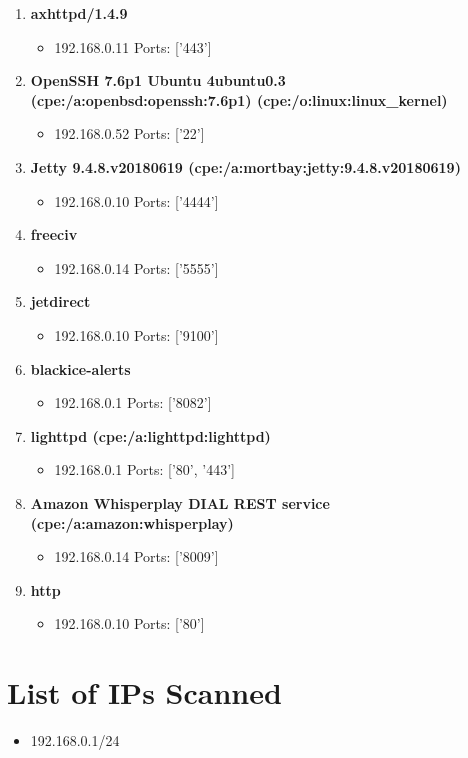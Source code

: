 \documentclass{article}
\begin{document}
\begin{enumerate}[wide, labelwidth=!, labelindent=0pt,
        label=\textbf{\large \arabic{enumi} \large}]
\begin{itemize}
\item 192.168.0.10 Ports: ['9090']
\end{itemize}
\item \textbf{\large axhttpd/1.4.9  \large}
\begin{itemize}
\item 192.168.0.11 Ports: ['443']
\end{itemize}
\item \textbf{\large OpenSSH 7.6p1 Ubuntu 4ubuntu0.3 (cpe:/a:openbsd:openssh:7.6p1) (cpe:/o:linux:linux\_kernel)  \large}
\begin{itemize}
\item 192.168.0.52 Ports: ['22']
\end{itemize}
\item \textbf{\large Jetty 9.4.8.v20180619 (cpe:/a:mortbay:jetty:9.4.8.v20180619)  \large}
\begin{itemize}
\item 192.168.0.10 Ports: ['4444']
\end{itemize}
\item \textbf{\large freeciv  \large}
\begin{itemize}
\item 192.168.0.14 Ports: ['5555']
\end{itemize}
\item \textbf{\large jetdirect  \large}
\begin{itemize}
\item 192.168.0.10 Ports: ['9100']
\end{itemize}
\item \textbf{\large blackice-alerts  \large}
\begin{itemize}
\item 192.168.0.1 Ports: ['8082']
\end{itemize}
\item \textbf{\large lighttpd (cpe:/a:lighttpd:lighttpd)  \large}
\begin{itemize}
\item 192.168.0.1 Ports: ['80', '443']
\end{itemize}
\item \textbf{\large Amazon Whisperplay DIAL REST service (cpe:/a:amazon:whisperplay)  \large}
\begin{itemize}
\item 192.168.0.14 Ports: ['8009']
\end{itemize}
\item \textbf{\large http  \large}
\begin{itemize}
\item 192.168.0.10 Ports: ['80']
\end{itemize}
\end{enumerate}
\section*{List of IPs Scanned}\begin{itemize}
\item 192.168.0.1/24

\end{itemize}
\end{document}
